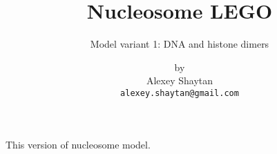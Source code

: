 \documentclass[12pt,onecolumn]{scrartcl}
\title{Nucleosome LEGO} %
\subtitle{Model variant 1: DNA and histone dimers}
\author{by \\ Alexey Shaytan \\ \texttt{alexey.shaytan@gmail.com}} %
\date{} %
\begin{document}
\maketitle %


\begin{abstract}
\end{abstract}

This version of nucleosome model.


%

%

\end{document}
